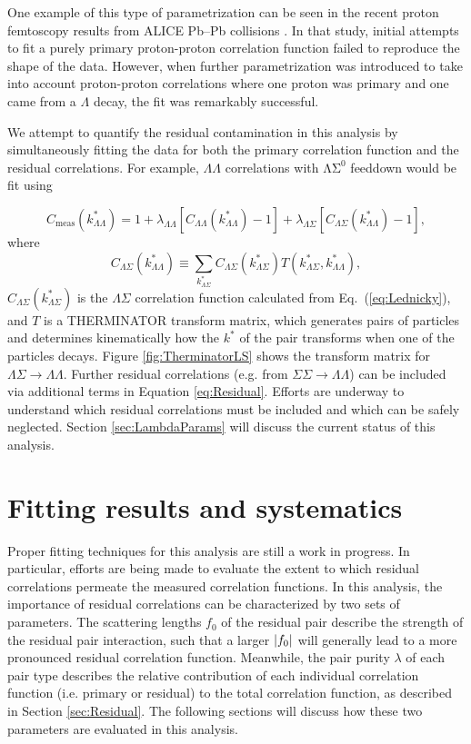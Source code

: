 One example of this type of parametrization can be seen in the recent proton femtoscopy results from ALICE Pb--Pb collisions \cite{Szymanski:2012AN}.  In that study, initial attempts to fit a purely primary proton-proton correlation function failed to reproduce the shape of the data.  However, when further parametrization was introduced to take into account proton-proton correlations where one proton was primary and one came from a $\Lambda$ decay, the fit was remarkably successful.

We attempt to quantify the residual contamination in this analysis by simultaneously fitting the data for both the primary correlation function and the residual correlations.  For example, $\Lambda\Lambda$ correlations with $\mathrm{\Lambda\Sigma^0}$ feeddown would be fit using 

\begin{equation}
\label{eq:Residual}
C_{\mathrm{meas}}(k^*_{\Lambda\Lambda})= 1 + \lambda_{\Lambda\Lambda}[C_{\Lambda\Lambda}(k^*_{\Lambda\Lambda})-1]+\lambda_{\Lambda\Sigma}[C_{\Lambda\Sigma}(k^*_{\Lambda\Lambda})-1],
\end{equation}
where $$C_{\Lambda\Sigma}(k^*_{\Lambda\Lambda}) \equiv \displaystyle\sum\limits_{k^*_{\Lambda\Sigma}}C_{\Lambda\Sigma}(k^*_{\Lambda\Sigma})T(k^*_{\Lambda\Sigma},k^*_{\Lambda\Lambda}),$$ $C_{\Lambda\Sigma}(k^*_{\Lambda\Sigma})$ is the $\Lambda\Sigma$ correlation function calculated from Eq.~(\ref{eq:Lednicky}), and $T$ is a THERMINATOR \cite{Chojnacki:2011hb} transform matrix, which generates pairs of particles and determines kinematically how the $k^*$ of the pair transforms when one of the particles decays.  Figure \ref{fig:TherminatorLS} shows the transform matrix for $\Lambda\Sigma \rightarrow \Lambda\Lambda$.  Further residual correlations (e.g. from $\Sigma\Sigma \rightarrow \Lambda\Lambda$) can be included via additional terms in Equation \ref{eq:Residual}.  Efforts are underway to understand which residual correlations must be included and which can be safely neglected.  Section \ref{sec:LambdaParams} will discuss the current status of this analysis.

\section{Fitting results and systematics}
\label{sec:FittingSystematics}

Proper fitting techniques for this analysis are still a work in progress.  In particular, efforts are being made to evaluate the extent to which residual correlations permeate the measured correlation functions.  In this analysis, the importance of residual correlations can be characterized by two sets of parameters.  The scattering lengths $f_0$ of the residual pair describe the strength of the residual pair interaction, such that a larger $\left\lvert f_0\right\rvert$ will generally lead to a more pronounced residual correlation function.  Meanwhile, the pair purity $\lambda$ of each pair type describes the relative contribution of each individual correlation function (i.e. primary or residual) to the total correlation function, as described in Section \ref{sec:Residual}. The following sections will discuss how these two parameters are evaluated in this analysis.


